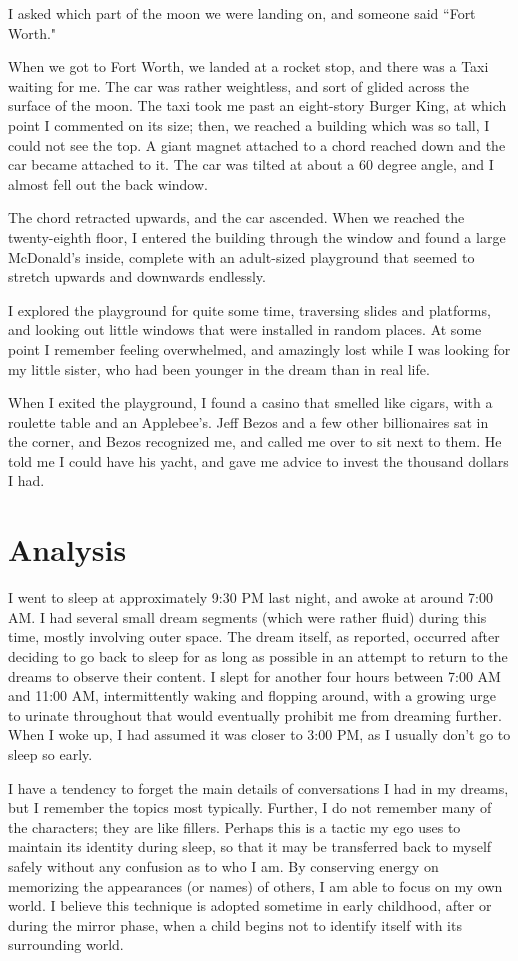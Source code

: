 \documentclass{article}
\begin{document}
		I asked which part of the moon we were landing on, and someone said ``Fort Worth." 
		
		When we got to Fort Worth, we landed at a rocket stop, and there was a Taxi waiting for me. The car was rather weightless, and sort of glided across the surface of the moon. The taxi took me past an eight-story Burger King, at which point I commented on its size; then, we reached a building which was so tall, I could not see the top. A giant magnet attached to a chord reached down and the car became attached to it. The car was tilted at about a 60 degree angle, and I almost fell out the back window.
		
		The chord retracted upwards, and the car ascended. When we reached the twenty-eighth floor, I entered the building through the window and found a large McDonald's inside, complete with an adult-sized playground that seemed to stretch upwards and downwards endlessly. 
		
		I explored the playground for quite some time, traversing slides and platforms, and looking out little windows that were installed in random places. At some point I remember feeling overwhelmed, and amazingly lost while I was looking for my little sister, who had been younger in the dream than in real life.
		
		When I exited the playground, I found a casino that smelled like cigars, with a roulette table and an Applebee's. Jeff Bezos and a few other billionaires sat in the corner, and Bezos recognized me, and called me over to sit next to them. He told me I could have his yacht, and gave me advice to invest the thousand dollars I had.

\section{Analysis}
I went to sleep at approximately 9:30 PM last night, and awoke at around 7:00 AM. I had several small dream segments (which were rather fluid) during this time, mostly involving outer space. The dream itself, as reported, occurred after deciding to go back to sleep for as long as possible in an attempt to return to the dreams to observe their content. I slept for another four hours between 7:00 AM and 11:00 AM, intermittently waking and flopping around, with a growing urge to urinate throughout that would eventually prohibit me from dreaming further. When I woke up, I had assumed it was closer to 3:00 PM, as I usually don't go to sleep so early. 

I have a tendency to forget the main details of conversations I had in my dreams, but I remember the topics most typically. Further, I do not remember many of the characters; they are like fillers. Perhaps this is a tactic my ego uses to maintain its identity during sleep, so that it may be transferred back to myself safely without any confusion as to who I am. By conserving energy on memorizing the appearances (or names) of others, I am able to focus on my own world. I believe this technique is adopted sometime in early childhood, after or during the mirror phase, when a child begins not to identify itself with its surrounding world.
\end{document}
